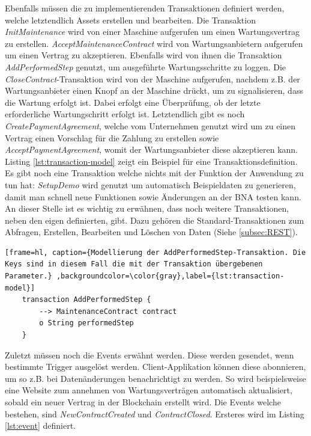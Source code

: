 Ebenfalls müssen die zu implementierenden Transaktionen definiert werden, welche letztendlich Assets erstellen und bearbeiten. Die Transaktion \textit{InitMaintenance} wird von einer Maschine aufgerufen um einen Wartungsvertrag zu erstellen. \textit{AcceptMaintenanceContract} wird von Wartungsanbietern aufgerufen um einen Vertrag zu akzeptieren. Ebenfalls wird von ihnen die Transaktion \textit{AddPerformedStep} genutzt, um ausgeführte Wartungsschritte zu loggen. Die \textit{CloseContract}-Transaktion wird von der Maschine aufgerufen, nachdem z.B. der Wartungsanbieter einen Knopf an der Maschine drückt, um zu signalisieren, dass die Wartung erfolgt ist. Dabei erfolgt eine Überprüfung, ob der letzte erforderliche Wartungschritt erfolgt ist. Letztendlich gibt es noch \textit{CreatePaymentAgreement}, welche vom Unternehmen genutzt wird um zu einen Vertrag einen Vorschlag für die Zahlung zu erstellen sowie \textit{AcceptPaymentAgreement}, womit der Wartungsanbieter diese akzeptieren kann. Listing \ref{lst:transaction-model} zeigt ein Beispiel für eine Transaktionsdefinition. Es gibt noch eine Transaktion welche nichts mit der Funktion der Anwendung zu tun hat: \textit{SetupDemo} wird genutzt um automatisch Beispieldaten zu generieren, damit man schnell neue Funktionen sowie Änderungen an der BNA testen kann. An dieser Stelle ist es wichtig zu erwähnen, dass noch weitere Transaktionen, neben den eigen definierten, gibt. Dazu gehören die Standard-Transaktionen zum Abfragen, Erstellen, Bearbeiten und Löschen von Daten (Siehe \ref{subsec:REST}).

\begin{lstfloat}
    \begin{lstlisting}[frame=hl, caption={Modellierung der AddPerformedStep-Transaktion. Die Keys sind in diesem Fall die mit der Transaktion übergebenen Parameter.} ,backgroundcolor=\color{gray},label={lst:transaction-model}]
    transaction AddPerformedStep {
        --> MaintenanceContract contract
        o String performedStep
    }
    \end{lstlisting} 
\end{lstfloat}

Zuletzt müssen noch die Events erwähnt werden. Diese werden gesendet, wenn bestimmte Trigger ausgelöst werden. Client-Applikation können diese abonnieren, um so z.B. bei Datenänderungen benachrichtigt zu werden. So wird beispielsweise eine Website zum annehmen von Wartungsverträgen automatisch aktualisiert, sobald ein neuer Vertrag in der Blockchain erstellt wird. Die Events welche bestehen, sind \textit{NewContractCreated} und \textit{ContractClosed}. Ersteres wird im Listing \ref{lst:event} definiert. 

